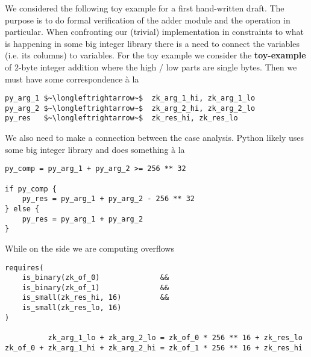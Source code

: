 We considered the following toy example for a first hand-written draft. The purpose is to do formal verification of the adder module and the  operation in particular. When confronting our (trivial) implementation in constraints to what is happening in some big integer \python{} library there is a need to connect the \zkEvm{} variables (i.e. its columns) to \python{} variables. For the toy example we consider the \textbf{toy-example} of $2$-byte integer addition where the high / low parts are single bytes. Then we must have some correspondence à la
\begin{lstlisting}
py_arg_1 $~\longleftrightarrow~$  zk_arg_1_hi, zk_arg_1_lo
py_arg_2 $~\longleftrightarrow~$  zk_arg_2_hi, zk_arg_2_lo
py_res   $~\longleftrightarrow~$  zk_res_hi, zk_res_lo
\end{lstlisting}
We also need to make a connection between the case analysis. Python likely uses some big integer library and does something à la
\begin{Verbatim}
py_comp = py_arg_1 + py_arg_2 >= 256 ** 32

if py_comp {
    py_res = py_arg_1 + py_arg_2 - 256 ** 32
} else {
    py_res = py_arg_1 + py_arg_2
}
\end{Verbatim}
While on the \corset{} side we are computing overflows 
\begin{Verbatim}
requires(
    is_binary(zk_of_0)              &&
    is_binary(zk_of_1)              &&
    is_small(zk_res_hi, 16)         &&
    is_small(zk_res_lo, 16)
)

          zk_arg_1_lo + zk_arg_2_lo = zk_of_0 * 256 ** 16 + zk_res_lo
zk_of_0 + zk_arg_1_hi + zk_arg_2_hi = zk_of_1 * 256 ** 16 + zk_res_hi
\end{Verbatim}
